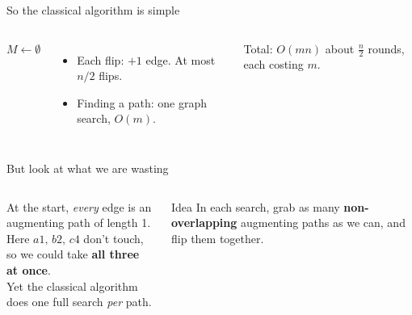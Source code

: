 \documentclass[aspectratio=169,11pt]{beamer}
\begin{document}
\begin{frame}{So the classical algorithm is simple}
\begin{columns}[c]
\begin{algorithm}[H]
\Large
$M\gets\emptyset$\;
\end{algorithm}
\begin{itemize}\setlength\itemsep{8pt}
  \item Each flip: $+1$ edge. At most $n/2$ flips.
  \item Finding a path: one graph search, $O(m)$.
\end{itemize}
\vspace{2mm}
\begin{alertblock}{Total: $O(mn)$}
about $\frac n2$ rounds, each costing $m$.
\end{alertblock}
\end{columns}
\end{frame}

\begin{frame}{But look at what we are wasting}
\begin{columns}[c]
\centering
{}
At the start, \emph{every} edge is an augmenting path of length 1.\\[3mm]
Here $a1,\,b2,\,c4$ don't touch, so we could take \textbf{all three at once}.\\[3mm]
Yet the classical algorithm does one full search \emph{per} path.
\begin{alertblock}{Idea}
In each search, grab as many \textbf{non-overlapping} augmenting paths as we can, and flip them together.
\end{alertblock}
\end{columns}
\end{frame}
\end{document}
